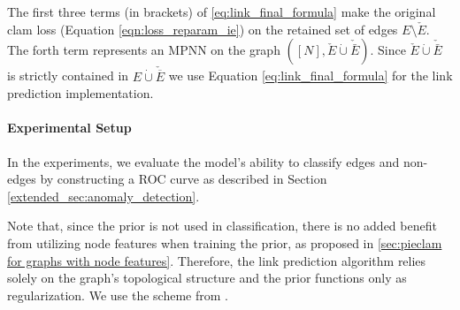 \documentclass{article}
\theoremstyle{plain}
\theoremstyle{definition}
\theoremstyle{remark}
\begin{document}
The first three terms (in brackets) of \ref{eq:link_final_formula} make the original clam loss (Equation \ref{eqn:loss_reparam_ie}) on the retained set of edges $E\setminus \check{E}$. The forth term represents an MPNN on the graph $([N], \check{E}\dot{\cup}\check{\bar{E}})$. Since $\check{E}\dot{\cup}\check{\bar{E}}$ is strictly contained in $E \dot{\cup} \check{\overline{E}}$ we use Equation \ref{eq:link_final_formula} for the link prediction implementation.  







\paragraph{Experimental Setup}
\label{sec: link experimental setup}
In the experiments, we evaluate the model’s ability to classify edges and non-edges by constructing a ROC curve as described in Section \ref{extended_sec:anomaly_detection}.

Note that, since the prior is not used in classification, there is no added benefit from utilizing node features when training the prior, as proposed in \ref{sec:pieclam for graphs with node features}. Therefore, the link prediction algorithm relies solely on the graph’s topological structure and the prior functions only as regularization. 
We use the scheme from \cite{zhou2022disenlink}. 
\end{document}
